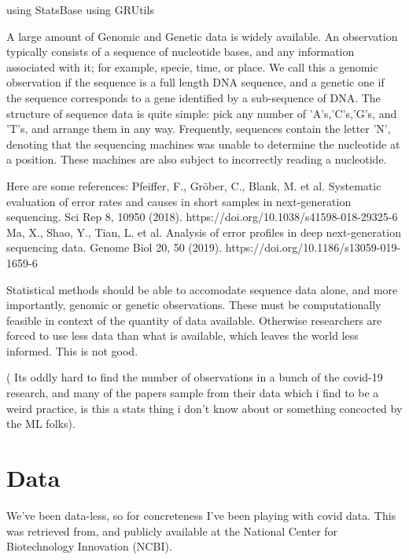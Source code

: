using StatsBase
using GRUtils

A large amount of Genomic and Genetic data is widely available. An observation typically consists of a sequence of nucleotide bases, and any information associated with it; for example, specie, time, or place. We call this a genomic observation if the sequence is a full length DNA sequence, and a genetic one if the sequence corresponds to a gene identified by a sub-sequence of DNA. The structure of sequence data is quite simple: pick any number of 'A's,'C's,'G's, and 'T's, and arrange them in any way. Frequently, sequences contain the letter 'N', denoting that the sequencing machines was unable to determine the nucleotide at a position. These machines are also subject to incorrectly reading a nucleotide.

Here are some references:
Pfeiffer, F., Gröber, C., Blank, M. et al. Systematic evaluation of error rates and causes in short samples in next-generation sequencing. Sci Rep 8, 10950 (2018). https://doi.org/10.1038/s41598-018-29325-6
Ma, X., Shao, Y., Tian, L. et al. Analysis of error profiles in deep next-generation sequencing data. Genome Biol 20, 50 (2019). https://doi.org/10.1186/s13059-019-1659-6

Statistical methods should be able to accomodate sequence data alone, and more importantly, genomic or genetic observations. These must be computationally feasible in context of the quantity of data available. Otherwise researchers are forced to use less data than what is available, which leaves the world less informed. This is not good.

( Its oddly hard to find the number of observations in a bunch of the covid-19 research, and many of the papers sample from their data which i find to be a weird practice, is this a stats thing i don't know about or something concocted by the ML folks).

 \section{Data}
We've been data-less, so for concreteness I've been playing with covid data.  This was retrieved from, and publicly available at the National Center for Biotechnology Innovation (NCBI).

